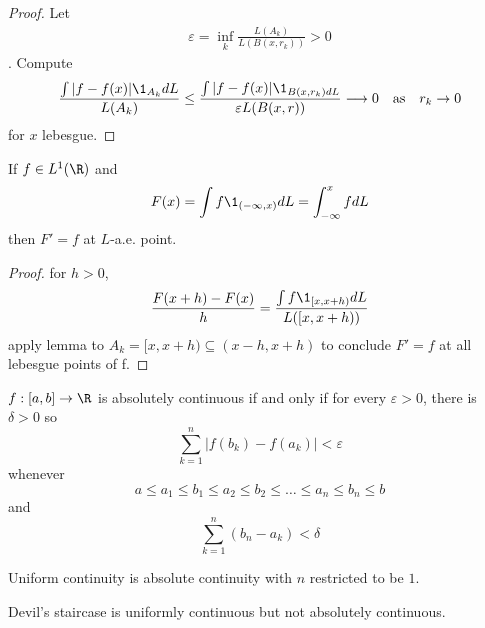 \begin{proof}
	Let
	\begin{align*}
		\varepsilon = \inf_{k} \frac{L(A_k)}{L(B(x,r_k))} > 0
	\end{align*}. Compute
	\begin{align*}
		\frac{\int | f - f(x) | \1_{A_k} dL}{L(A_k)} \leq \frac{\int |f - f(x) | \1_{B(x,r_k) dL}}{\varepsilon L(B(x,r))} 
		\longrightarrow 0 \quad \text{as} \quad r_k \to 0
	\end{align*} 
	for $x$ lebesgue.
\end{proof}


\begin{corollary}
	If $f \in L^1(\R)$ and
	\[
		F(x) = \int f \1_{(-\infty, x)} dL = \int_{-\infty}^{x} f dL
	\] then
	$F' = f$ at $L$-a.e. point.
\end{corollary}

\begin{proof}
	for $h > 0$,
	 \[
		\frac{F(x +h) - F(x)}{h} = \frac{\int f \1_{[x,x+h)} dL}{L([x,x+h))}
	\] 
	apply lemma to $A_k = [x, x+h) \subseteq (x-h, x+h)$ to conclude $F' = f$ at all lebesgue points of f.
\end{proof}




\begin{definition}
	$f: [a,b] \to \R$ is absolutely continuous if and only if for every $\varepsilon > 0$, there is $\delta > 0$ so
	\[
		\sum_{k=1}^n |f(b_{k}) - f(a_k) | < \varepsilon
	\]whenever
	\[
		a \leq a_1 \leq b_1 \leq a_2 \leq b_2 \leq \ldots \leq a_n \leq b_n \leq b
	\] and
	\[
		\sum_{k=1}^n (b_n - a_k) < \delta
	\] 
\end{definition}

\begin{remark}
	Uniform continuity is absolute continuity with $n$ restricted to be $1$.
\end{remark}

\begin{example}
	Devil's staircase is uniformly continuous but not absolutely continuous.
\end{example}



